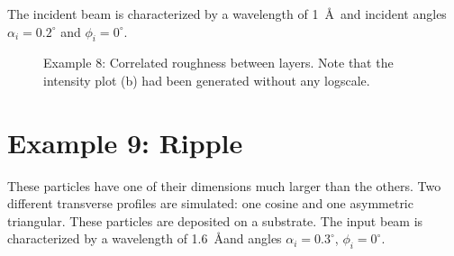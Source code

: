 The incident beam is characterized by a wavelength of 1~\AA \ and incident angles $\alpha_i=0.2^{\circ}$ and $\phi_i=0^{\circ}$. 
\begin{figure}[H]
\hfill
{}
\hfill
{}
\hfill
\caption{Example 8: Correlated roughness between layers. Note that the intensity plot (b) had been generated without any logscale.}
\label{fig:PythonEx8Rough}
\end{figure}

 
\newpage
\section{Example 9: Ripple}
These particles have one of their dimensions much larger than the others.
Two different transverse profiles are simulated: one cosine and one asymmetric triangular.
These particles are deposited on a substrate. The input beam is characterized by a wavelength of 1.6~\AA and angles $\alpha_i=0.3^{\circ}$, $\phi_i=0^{\circ}$.

